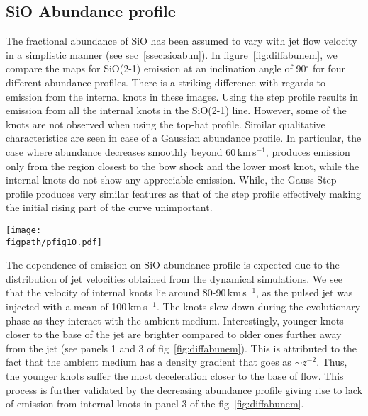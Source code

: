 \documentclass[useAMS,usenatbib]{mn2e}
\newcommand{\figpath}{../NEWFIGS}
\begin{document}
\subsection{SiO Abundance profile}
\label{ssec:sioabunem}
The fractional abundance of SiO has been assumed to vary with jet flow velocity in
a simplistic manner (see sec~\ref{ssec:sioabun}). In
figure~\ref{fig:diffabunem}, we compare the maps for SiO(2-1)
emission at an inclination angle of 90$^{\circ}$ for four different abundance profiles. 
There is a striking difference with regards to
emission from the internal knots in these images. Using the step profile results in
emission from  all the internal knots in the SiO(2-1) line. However, some of
the knots are not observed when using the top-hat profile. 
Similar qualitative characteristics are seen in case of a Gaussian
abundance profile. In particular, the case where abundance decreases
smoothly beyond 60\,km\,s$^{-1}$,
produces emission only from the region closest to the bow shock and the lower most knot, 
while the internal knots do not show any appreciable emission. While, the 
Gauss Step profile produces very similar
features as that of the step profile effectively making the initial rising part 
of the curve unimportant. 
%

\begin{figure*}
 \texttt{[image: \\figpath/pfig10.pdf]}%
 \caption{Integrated intensity maps of SiO(2-1) line in units of K-km\,s$^{-1}$, for runs with molecular
   cooling and having different abundance profiles.}
\label{fig:diffabunem}
\end{figure*}


The dependence of emission on SiO abundance profile is expected due to
the distribution of jet velocities obtained from the dynamical
simulations. We see that the velocity of internal knots lie around
80-90\,km\,s$^{-1}$, as the pulsed jet was injected with a mean of
100\,km\,s$^{-1}$. The knots slow down during the evolutionary
phase as they interact with the ambient medium. Interestingly, younger
knots closer to the base of the jet are brighter compared to older
ones further away from the jet (see panels 1 and 3 of
fig~\ref{fig:diffabunem}). This is attributed to the fact that the
ambient medium has a density gradient that goes as $\sim
z^{-2}$. Thus, the younger knots suffer the most deceleration closer
to the base of flow. This process is further validated by
the decreasing abundance profile giving rise to 
lack of emission from internal knots in panel 3 of the fig~\ref{fig:diffabunem}. 
%
\end{document}
